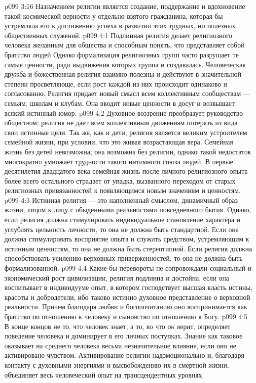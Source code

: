 \vs p099 3:16 Назначением религии является создание, поддержание и вдохновение такой космической верности у отдельно взятого гражданина, которая бы устремляла его к достижению успеха в развитии этих трудных, но полезных общественных служений.
\vs p099 4:1 Подлинная религия делает религиозного человека желанным для общества и способным понять, что представляет собой братство людей Однако формализация религиозных групп часто разрушает те самые ценности, ради выдвижения которых группа и создавалась. Человеческая дружба и божественная религия взаимно полезны и действуют в значительной степени просветляюще, если рост каждой из них происходит одинаково и согласованно. Религия придает новый смысл всем коллективным сообществам --- семьям, школам и клубам. Она вводит новые ценности в досуг и возвышает всякий истинный юмор.
\vs p099 4:2 Духовное воззрение преобразует руководство обществом; религия не дает всем коллективным движениям потерять из вида свои истинные цели. Так же, как и дети, религия является великим устроителем семейной жизни, при условии, что это живая возрастающая вера. Семейная жизнь без детей невозможна; она возможна без религии, однако такой недостаток многократно умножает трудности такого интимного союза людей. В первые десятилетия двадцатого века семейная жизнь после личного религиозного опыта более всего остального страдает от упадка, вызванного переходом от старых религиозных привязанностей к появляющимся новым значениям и ценностям.
\vs p099 4:3 \pc Истинная религия --- это наполненный смыслом, динамичный образ жизни, лицом к лицу с обыденными реальностями повседневного бытия. Однако, если религия должна стимулировать индивидуальное становление характера и углублять цельность личности, то она не должна быть стандартной. Если она должна стимулировать восприятие опыта и служить средством, устремляющим к истинным ценностям, то она не должна быть стереотипной. Если религия должна способствовать усилению верховных приверженностей, то она не должна быть формализованной.
\vs p099 4:4 Какие бы перевороты не сопровождали социальный и экономический рост цивилизации, религия подлинна и достойна, если она воспитывает в индивидууме опыт, в котором господствует высшая власть истины, красоты и добродетели, ибо таково истинно духовное представление о верховной реальности. Причем благодаря любви и богопочитанию оно воспринимается как братство по отношению к человеку и сыновство по отношению к Богу.
\vs p099 4:5 В конце концов не то, что человек знает, а то, во что он верит, определяет поведение человека и доминирует в его личных поступках. Знание как таковое оказывает на среднего человека весьма незначительное влияние, если оно не активировано чувством. Активирование религии надэмоционально и, благодаря контакту с духовными энергиями и высвобождению их в смертной жизни, объединяет весь человеческий опыт на трансцендентных уровнях.
